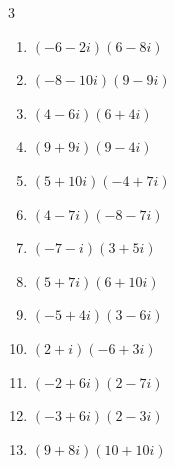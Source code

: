 \begin{multicols}{3}
\begin{enumerate}
        \phantom{$\displaystyle =-6-22i$}

  \item $\displaystyle (-6-2i)(6-8i)$

        \phantom{$\displaystyle =-52+36i$}

  \item $\displaystyle (-8-10i)(9-9i)$

        \phantom{$\displaystyle =-162-18i$}

  \item $\displaystyle (4-6i)(6+4i)$

        \phantom{$\displaystyle =48-20i$}

  \item $\displaystyle (9+9i)(9-4i)$

        \phantom{$\displaystyle =117+45i$}

  \item $\displaystyle (5+10i)(-4+7i)$

        \phantom{$\displaystyle =-90-5i$}

  \item $\displaystyle (4-7i)(-8-7i)$

        \phantom{$\displaystyle =-81+28i$}

  \item $\displaystyle (-7-i)(3+5i)$

        \phantom{$\displaystyle =-16-38i$}

\columnbreak %

  \item $\displaystyle (5+7i)(6+10i)$

        \phantom{$\displaystyle =-40+92i$}

  \item $\displaystyle (-5+4i)(3-6i)$

        \phantom{$\displaystyle =9+42i$}

  \item $\displaystyle (2+i)(-6+3i)$

        \phantom{$\displaystyle =-15$}

  \item $\displaystyle (-2+6i)(2-7i)$

        \phantom{$\displaystyle =38+26i$}

  \item $\displaystyle (-3+6i)(2-3i)$

        \phantom{$\displaystyle =12+21i$}

  \item $\displaystyle (9+8i)(10+10i)$


\end{enumerate}
\end{multicols}
